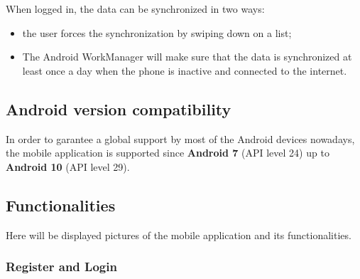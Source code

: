 When logged in, the data can be synchronized in two ways:
\begin{itemize}
    \item the user forces the synchronization by swiping down on a list;
    \item The Android WorkManager will make sure that the data is synchronized at least once a 
    day when the phone is inactive and connected to the internet.    
\end{itemize}

\subsection{Android version compatibility}

In order to garantee a global support by most of the Android devices nowadays, the mobile application is supported since \textbf{Android 7} (API level 24)
up to \textbf{Android 10} (API level 29).

\subsection{Functionalities}

Here will be displayed pictures of the mobile application and its functionalities.\\

\subsubsection{Register and Login}

